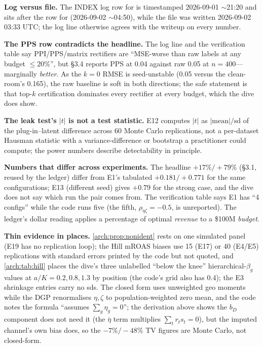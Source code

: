 \begin{reviewernote}[(compiler)]
\textbf{Log versus file.} The INDEX log row for  is timestamped 2026-09-01 $\sim$21:20 and sits after the row for  (2026-09-02 $\sim$04:50), while the file was written 2026-09-02 03:33 UTC; the log line otherwise agrees with the writeup on every number.

\textbf{The PPS row contradicts the headline.} The log line and the verification table say PPI/PPS/matrix rectifiers are ``MSE-worse than raw labels at any budget $\le 20\%$'', but \S3.4 reports PPS at 0.04 against raw 0.05 at $n = 400$---marginally \emph{better}. As the $k = 0$ RMSE is seed-unstable (0.05 versus the clean-room's 0.165), the raw baseline is soft in both directions; the safe statement is that top-$k$ certification dominates every rectifier at every budget, which the dive does show.

\textbf{The leak test's $|t|$ is not a test statistic.} E12 computes $|t|$ as $|\text{mean}|/\text{sd}$ of the plug-in--latent difference across 60 Monte Carlo replications, not a per-dataset Hausman statistic with a variance-difference or bootstrap a practitioner could compute; the power numbers describe detectability in principle.

\textbf{Numbers that differ across experiments.} The headline $+17\%/+79\%$ (\S3.1, reused by the ledger) differ from E1's tabulated $+0.181/+0.771$ for the same configurations; E13 (different seed) gives $+0.79$ for the strong case, and the dive does not say which run the pair comes from. The verification table says E1 has ``4 configs'' while the code runs five (the fifth, $\rho_{\eta\zeta} = -0.5$, is unreported). The ledger's dollar reading applies a percentage of optimal \emph{revenue} to a \$100M \emph{budget}.

\textbf{Thin evidence in places.} \cref{arch:prop:nonident} rests on one simulated panel (E19 has no replication loop); the Hill mROAS biases use 15 (E17) or 40 (E4/E5) replications with standard errors printed by the code but not quoted, and \cref{arch:tab:hill} places the dive's three unlabelled ``below the knee'' hierarchical-$\beta_g$ values at $a/K = 0.2, 0.8, 1.3$ by position (the code's grid also has 0.4); the E3 shrinkage entries carry no sds. The closed form uses unweighted geo moments while the DGP renormalises $\eta,\zeta$ to population-weighted zero mean, and the code notes the formula ``assumes $\sum_g\eta_g = 0$''; the derivation above shows the $b_D$ component does not need it (the $\bar\eta$ term multiplies $\sum_t r_ts_t = 0$), but the imputed channel's own bias does, so the $-7\%/-48\%$ TV figures are Monte Carlo, not closed-form.


\end{reviewernote}
